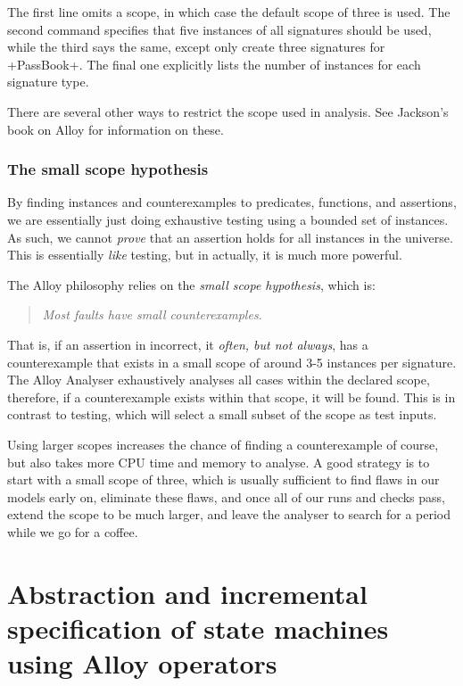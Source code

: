 The first line omits a scope, in which case the default scope of three is used. The second command specifies that five instances of all signatures should be used, while the third says the same, except only create three signatures for \A+PassBook+. The final one explicitly lists the number of instances for each signature type.

There are several other ways to restrict the scope used in analysis. See Jackson's book on Alloy \cite{jackson2012software} for information on these.

\subsubsection{The small scope hypothesis}

By finding instances and counterexamples to predicates, functions, and assertions, we are essentially just doing exhaustive testing using a bounded set of instances. As such, we cannot \emph{prove} that an assertion holds for all instances in the universe. This is essentially \emph{like} testing, but in actually, it is much more powerful. 

The Alloy philosophy relies on the \emph{small scope hypothesis}, which is:

\begin{quote}
 \emph{Most faults have small counterexamples}.
\end{quote}

That is, if an assertion in incorrect, it \emph{often, but not always}, has a counterexample that exists in a small scope of around 3-5 instances per signature. The Alloy Analyser exhaustively analyses all cases within the declared scope, therefore, if a counterexample exists within that scope, it will be found. This is in contrast to testing, which will select a small subset of the scope as test inputs. 

Using larger scopes increases the chance of finding a counterexample of course, but also takes more CPU time and memory to analyse. A good strategy is to start with a small scope of three, which is usually sufficient to find flaws in our models early on, eliminate these flaws, and once all of our runs and checks pass, extend the scope to be much larger, and leave the analyser to search for a period while we go for a coffee.


\section{Abstraction and incremental specification of state machines using Alloy operators}

